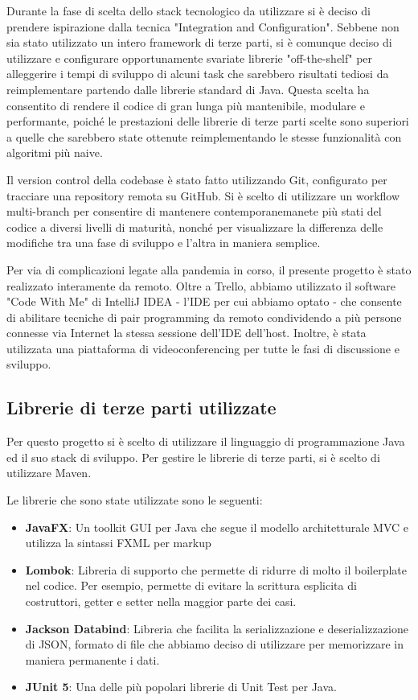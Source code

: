 \documentclass{article}
\begin{document}
Durante la fase di scelta dello stack tecnologico da utilizzare si è deciso di prendere ispirazione dalla tecnica "Integration and Configuration". Sebbene non sia stato utilizzato un intero framework di terze parti, si è comunque deciso di utilizzare e configurare opportunamente svariate librerie "off-the-shelf" per alleggerire i tempi di sviluppo di alcuni task che sarebbero risultati tediosi da reimplementare partendo dalle librerie standard di Java. Questa scelta ha consentito di rendere il codice di gran lunga più mantenibile, modulare e performante, poiché le prestazioni delle librerie di terze parti scelte sono superiori a quelle che sarebbero state ottenute reimplementando le stesse funzionalità con algoritmi più naive.

Il version control della codebase è stato fatto utilizzando Git, configurato per tracciare una repository remota su GitHub. Si è scelto di utilizzare un workflow multi-branch per consentire di mantenere contemporanemanete più stati del codice a diversi livelli di maturità, nonché per visualizzare la differenza delle modifiche tra una fase di sviluppo e l'altra in maniera semplice.

Per via di complicazioni legate alla pandemia in corso, il presente progetto è stato realizzato interamente da remoto. Oltre a Trello, abbiamo utilizzato il software "Code With Me" di IntelliJ IDEA - l'IDE per cui abbiamo optato - che consente di abilitare tecniche di pair programming da remoto condividendo a più persone connesse via Internet la stessa sessione dell'IDE dell'host. Inoltre, è stata utilizzata una piattaforma di videoconferencing per tutte le fasi di discussione e sviluppo.

\subsection{Librerie di terze parti utilizzate}

Per questo progetto si è scelto di utilizzare il linguaggio di programmazione Java ed il suo stack di sviluppo. Per gestire le librerie di terze parti, si è scelto di utilizzare Maven.

Le librerie che sono state utilizzate sono le seguenti:

\begin{itemize}
    \item \textbf{JavaFX}: Un toolkit GUI per Java che segue il modello architetturale MVC e utilizza la sintassi FXML per markup
    \item \textbf{Lombok}: Libreria di supporto che permette di ridurre di molto il boilerplate nel codice. Per esempio, permette di evitare la scrittura esplicita di costruttori, getter e setter nella maggior parte dei casi.
    \item \textbf{Jackson Databind}: Libreria che facilita la serializzazione e deserializzazione di JSON, formato di file che abbiamo deciso di utilizzare per memorizzare in maniera permanente i dati.
    \item \textbf{JUnit 5}: Una delle più popolari librerie di Unit Test per Java.
\end{itemize}
\end{document}
